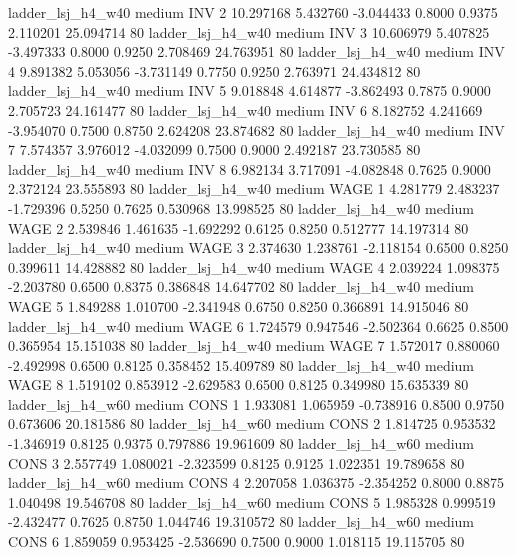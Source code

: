      ladder_lsj_h4_w40     medium      INV                 2 10.297168 5.432760 -3.044433 0.8000 0.9375  2.110201   25.094714 80
     ladder_lsj_h4_w40     medium      INV                 3 10.606979 5.407825 -3.497333 0.8000 0.9250  2.708469   24.763951 80
     ladder_lsj_h4_w40     medium      INV                 4  9.891382 5.053056 -3.731149 0.7750 0.9250  2.763971   24.434812 80
     ladder_lsj_h4_w40     medium      INV                 5  9.018848 4.614877 -3.862493 0.7875 0.9000  2.705723   24.161477 80
     ladder_lsj_h4_w40     medium      INV                 6  8.182752 4.241669 -3.954070 0.7500 0.8750  2.624208   23.874682 80
     ladder_lsj_h4_w40     medium      INV                 7  7.574357 3.976012 -4.032099 0.7500 0.9000  2.492187   23.730585 80
     ladder_lsj_h4_w40     medium      INV                 8  6.982134 3.717091 -4.082848 0.7625 0.9000  2.372124   23.555893 80
     ladder_lsj_h4_w40     medium     WAGE                 1  4.281779 2.483237 -1.729396 0.5250 0.7625  0.530968   13.998525 80
     ladder_lsj_h4_w40     medium     WAGE                 2  2.539846 1.461635 -1.692292 0.6125 0.8250  0.512777   14.197314 80
     ladder_lsj_h4_w40     medium     WAGE                 3  2.374630 1.238761 -2.118154 0.6500 0.8250  0.399611   14.428882 80
     ladder_lsj_h4_w40     medium     WAGE                 4  2.039224 1.098375 -2.203780 0.6500 0.8375  0.386848   14.647702 80
     ladder_lsj_h4_w40     medium     WAGE                 5  1.849288 1.010700 -2.341948 0.6750 0.8250  0.366891   14.915046 80
     ladder_lsj_h4_w40     medium     WAGE                 6  1.724579 0.947546 -2.502364 0.6625 0.8500  0.365954   15.151038 80
     ladder_lsj_h4_w40     medium     WAGE                 7  1.572017 0.880060 -2.492998 0.6500 0.8125  0.358452   15.409789 80
     ladder_lsj_h4_w40     medium     WAGE                 8  1.519102 0.853912 -2.629583 0.6500 0.8125  0.349980   15.635339 80
     ladder_lsj_h4_w60     medium     CONS                 1  1.933081 1.065959 -0.738916 0.8500 0.9750  0.673606   20.181586 80
     ladder_lsj_h4_w60     medium     CONS                 2  1.814725 0.953532 -1.346919 0.8125 0.9375  0.797886   19.961609 80
     ladder_lsj_h4_w60     medium     CONS                 3  2.557749 1.080021 -2.323599 0.8125 0.9125  1.022351   19.789658 80
     ladder_lsj_h4_w60     medium     CONS                 4  2.207058 1.036375 -2.354252 0.8000 0.8875  1.040498   19.546708 80
     ladder_lsj_h4_w60     medium     CONS                 5  1.985328 0.999519 -2.432477 0.7625 0.8750  1.044746   19.310572 80
     ladder_lsj_h4_w60     medium     CONS                 6  1.859059 0.953425 -2.536690 0.7500 0.9000  1.018115   19.115705 80
